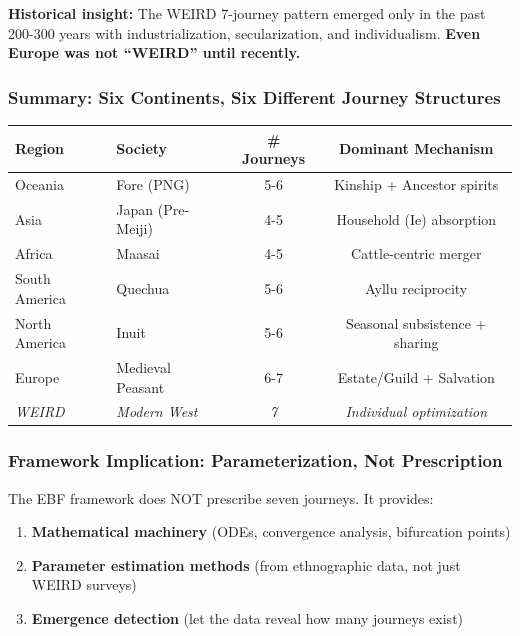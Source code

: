 {{{\textbf{Historical insight:} The WEIRD 7-journey pattern emerged only in the past 200-300 years with industrialization, secularization, and individualism. \textbf{Even Europe was not ``WEIRD'' until recently.}

\subsubsection{Summary: Six Continents, Six Different Journey Structures}

\begin{center}
\small
\begin{tabular}{@{}llcc@{}}
\toprule
\textbf{Region} & \textbf{Society} & \textbf{\# Journeys} & \textbf{Dominant Mechanism} \\
\midrule
Oceania & Fore (PNG) & 5-6 & Kinship + Ancestor spirits \\
Asia & Japan (Pre-Meiji) & 4-5 & Household (Ie) absorption \\
Africa & Maasai & 4-5 & Cattle-centric merger \\
South America & Quechua & 5-6 & Ayllu reciprocity \\
North America & Inuit & 5-6 & Seasonal subsistence + sharing \\
Europe & Medieval Peasant & 6-7 & Estate/Guild + Salvation \\
\midrule
\textit{WEIRD} & \textit{Modern West} & \textit{7} & \textit{Individual optimization} \\
\bottomrule
\end{tabular}
\end{center}

\subsubsection{Framework Implication: Parameterization, Not Prescription}

\begin{tcolorbox}[colback=orange!5!white, colframe=orange!75!black, title=Methodological Note: Cultural Adaptation]

The EBF framework does NOT prescribe seven journeys. It provides:

\begin{enumerate}[nosep]
\item \textbf{Mathematical machinery} (ODEs, convergence analysis, bifurcation points)
\item \textbf{Parameter estimation methods} (from ethnographic data, not just WEIRD surveys)
\item \textbf{Emergence detection} (let the data reveal how many journeys exist)
\end{enumerate}


\end{tcolorbox}}}}
